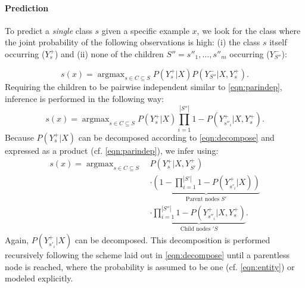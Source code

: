 \documentclass[10pt,twocolumn,letterpaper]{article}
\DeclareMathOperator*{\argmax}{argmax}
\begin{document}
\paragraph{Prediction} To predict a \emph{single} class $s$ given a specific example $x$, we look for the class where
the joint probability of the following observations is high: (i) the class $s$ itself occurring ($Y_s^+$)
and (ii) none of the children $S''=s''_1,\ldots,s''_m$ occurring ($Y_{S''}^-$):

\begin{equation}
    s(x) = \argmax_{s \in C \subseteq S}{P(Y_s^+|X)}P(Y_{S''}^-|X,Y_s^+). %
\end{equation}
Requiring the children to
be pairwise independent similar to \cref{eqn:parindep}, inference is performed in the following way:
\begin{equation}
   s(x) =  \argmax_{s \in C \subseteq S}{P(Y_s^+|X)\prod_{i=1}^{|S''|}{1-P(Y_{s''_i}^+|X,Y_s^+)}}.
\end{equation}
Because $P(Y_s^+|X)$ can be decomposed according to \cref{eqn:decompose} and expressed as a product (cf. \cref{eqn:parindep}),
we infer using:
\begin{equation}
  \begin{split}
   s(x) = \argmax_{s \in C \subseteq S}\,&
   P(Y_s^+|X, Y_{S'}^+)\\
   &\cdot \underbrace{(1 - \prod_{i=1}^{|S'|}{1-P(Y_{s'_i}^+|X)})}_{\text{Parent nodes }S'}\\
   &\cdot \underbrace{\prod_{i=1}^{|S''|}{1-P(Y_{s''_i}^+|X,Y_s^+)}}_{\text{Child nodes }'S}.
   \label{eqn:argmax}
  \end{split}
\end{equation}
Again, $P(Y_{s'_i}^+|X)$ can be decomposed. This decomposition is performed recursively
following the scheme laid out in \cref{eqn:decompose} until a parentless node is reached,
where the probability is assumed to be one (cf. \cref{eqn:entity}) or modeled explicitly.
\end{document}
